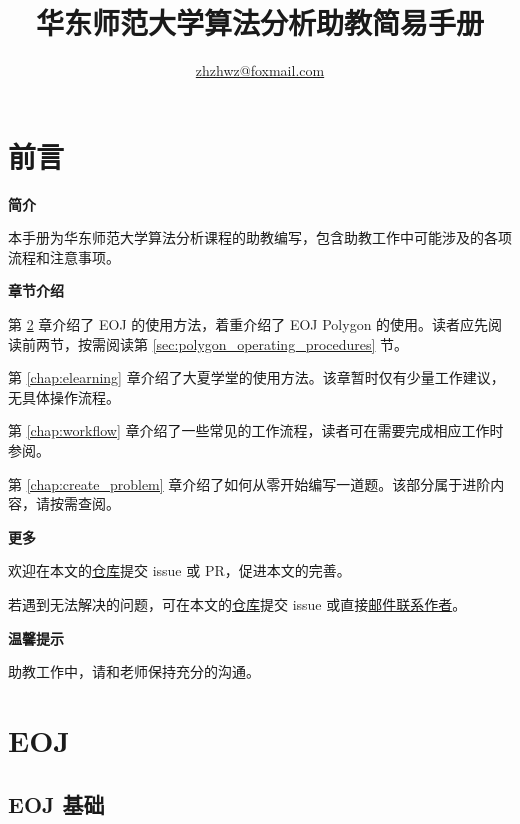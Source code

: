 \documentclass[oneside]{book}
\title{华东师范大学算法分析助教简易手册}
\author{\href{mailto:zhzhwz@foxmail.com}{zhzhwz@foxmail.com}}
\begin{document}
\frontmatter

\maketitle

\chapter{前言}

\noindent \textbf{简介}

本手册为华东师范大学算法分析课程的助教编写，包含助教工作中可能涉及的各项流程和注意事项。

\bigbreak

\noindent \textbf{章节介绍}

第 \ref{chap:eoj} 章介绍了 EOJ 的使用方法，着重介绍了 EOJ Polygon 的使用。读者应先阅读前两节，按需阅读第 \ref{sec:polygon_operating_procedures} 节。

第 \ref{chap:elearning} 章介绍了大夏学堂的使用方法。该章暂时仅有少量工作建议，无具体操作流程。

第 \ref{chap:workflow} 章介绍了一些常见的工作流程，读者可在需要完成相应工作时参阅。

第 \ref{chap:create_problem} 章介绍了如何从零开始编写一道题。该部分属于进阶内容，请按需查阅。

\bigbreak

\noindent \textbf{更多}

欢迎在本文的\href{https://github.com/zhzhwz/AlgorithmTAManual}{仓库}提交 issue 或 PR，促进本文的完善。

若遇到无法解决的问题，可在本文的\href{https://github.com/zhzhwz/AlgorithmTAManual}{仓库}提交 issue 或直接\href{mailto:zhzhwz@foxmail.com}{邮件联系作者}。 

\bigbreak

\noindent \textbf{温馨提示}

助教工作中，请和老师保持充分的沟通。

\tableofcontents

\mainmatter

\chapter{EOJ}

\label{chap:eoj}

\section{EOJ 基础}
\end{document}
